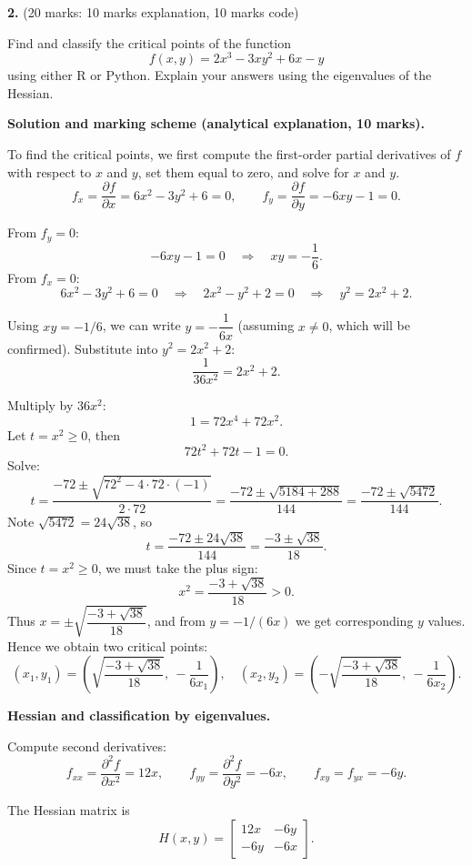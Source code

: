 \documentclass{article}
\begin{document}
\bigskip


\textbf{2.} (20 marks: 10 marks explanation, 10 marks code)

Find and classify the critical points of the function
\[
f(x,y) = 2x^3 - 3xy^2 + 6x - y
\]
using either R or Python. Explain your answers using the eigenvalues of the Hessian.

\begin{mdframed}[linecolor=black, linewidth=1pt]
\textbf{Solution and marking scheme (analytical explanation, 10 marks).}

To find the critical points, we first compute the first-order partial derivatives of $f$ with respect to $x$ and $y$, set them equal to zero, and solve for $x$ and $y$.
\[
f_x = \frac{\partial f}{\partial x} = 6x^2 - 3y^2 + 6 = 0, \qquad
f_y = \frac{\partial f}{\partial y} = -6xy - 1 = 0.
\]

From $f_y=0$:
\[
-6xy - 1 = 0 \quad\Rightarrow\quad xy = -\frac{1}{6}.
\]
From $f_x=0$:
\[
6x^2 - 3y^2 + 6 = 0 \quad\Rightarrow\quad 2x^2 - y^2 + 2 = 0
\quad\Rightarrow\quad y^2 = 2x^2 + 2.
\]

Using $xy=-1/6$, we can write $y = -\dfrac{1}{6x}$ (assuming $x\neq 0$, which will be confirmed). Substitute into $y^2=2x^2+2$:
\[
\frac{1}{36x^2} = 2x^2 + 2.
\]

Multiply by $36x^2$:
\[
1 = 72x^4 + 72x^2.
\]
Let $t=x^2\ge 0$, then
\[
72t^2 + 72t - 1 = 0.
\]
Solve:
\[
t = \frac{-72 \pm \sqrt{72^2 - 4\cdot 72\cdot (-1)}}{2\cdot 72}
= \frac{-72 \pm \sqrt{5184 + 288}}{144}
= \frac{-72 \pm \sqrt{5472}}{144}.
\]
Note $\sqrt{5472}=24\sqrt{38}$, so
\[
t = \frac{-72 \pm 24\sqrt{38}}{144}
  = \frac{-3 \pm \sqrt{38}}{18}.
\]
Since $t=x^2\ge0$, we must take the plus sign:
\[
x^2 = \frac{-3 + \sqrt{38}}{18} > 0.
\]
Thus $x = \pm \sqrt{\dfrac{-3 + \sqrt{38}}{18}}$, and from $y=-1/(6x)$ we get corresponding $y$ values. Hence we obtain two critical points:
\[
(x_1,y_1) = \left(\sqrt{\frac{-3 + \sqrt{38}}{18}},\ -\frac{1}{6x_1}\right),
\quad
(x_2,y_2) = \left(-\sqrt{\frac{-3 + \sqrt{38}}{18}},\ -\frac{1}{6x_2}\right).
\]

\medskip
\textbf{Hessian and classification by eigenvalues.}

Compute second derivatives:
\[
f_{xx} = \frac{\partial^2 f}{\partial x^2} = 12x,\qquad
f_{yy} = \frac{\partial^2 f}{\partial y^2} = -6x,\qquad
f_{xy} = f_{yx} = -6y.
\]

The Hessian matrix is
\[
H(x,y) =
\begin{bmatrix}
12x & -6y\\
-6y & -6x
\end{bmatrix}.
\]


\end{mdframed}
\end{document}
